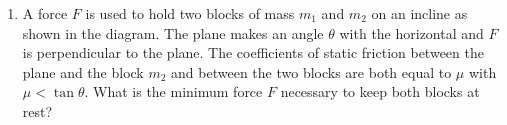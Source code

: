 \documentclass[12pt,letterpaper]{article}
\begin{document}
\begin{enumerate}

\item
A force $F$ is used to hold two blocks of mass $m_1$ and $m_2$ on an incline as shown in the diagram. The plane makes an angle $\theta$ with the horizontal and $F$ is perpendicular to the plane. The coefficients of static friction between the plane and the block $m_2$ and between the two blocks are both equal to $\mu$ with $\mu < \tan\theta$. What is the minimum force $F$ necessary to keep both blocks at rest?

\begin{tabular}{l r}


\end{tabular}
\end{enumerate}
\end{document}
